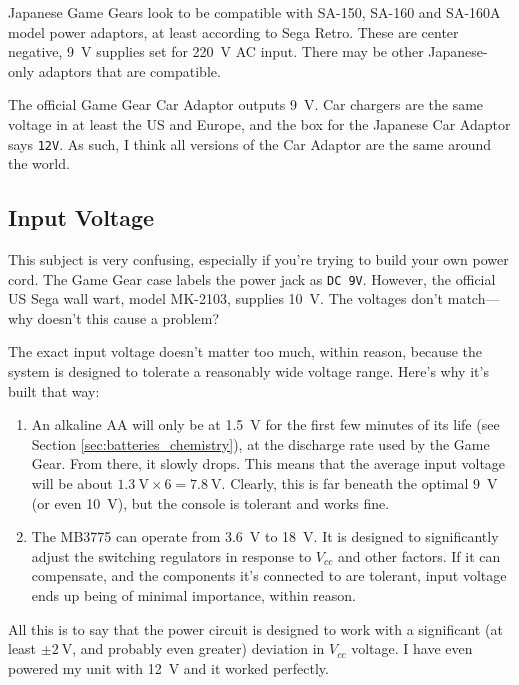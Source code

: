 \documentclass{article}
\newcommand{\Vcc}{$V_{cc}$}
\newcommand{\model}{\textsf}
\begin{document}
Japanese Game Gears look to be compatible with \model{SA-150},
\model{SA-160} and \model{SA-160A} model power adaptors, at least
according to Sega Retro. These are center negative, \qty{9}{\volt}
supplies set for \qty{220}{\volt} AC input. There may be other
Japanese-only adaptors that are compatible.

The official Game Gear Car Adaptor outputs \qty{9}{\volt}. Car
chargers are the same voltage in at least the US and Europe, and the
box for the Japanese Car Adaptor says \texttt{12V}. As such, I think
all versions of the Car Adaptor are the same around the world.

\subsection{Input Voltage}
\label{sec:input_voltage}
This subject is very confusing, especially if you're trying to build
your own power cord. The Game Gear case labels the power jack as
\texttt{DC 9V}. However, the official US Sega wall wart, model
\model{MK-2103}, supplies \qty{10}{\volt}. The voltages don't
match---why doesn't this cause a problem?

The exact input voltage doesn't matter too much, within reason,
because the system is designed to tolerate a reasonably wide voltage
range. Here's why it's built that way:

\begin{enumerate}
\item An alkaline AA will only be at \qty{1.5}{\volt} for the first
  few minutes of its life (see Section \ref{sec:batteries_chemistry}),
  at the discharge rate used by the Game Gear. From there, it slowly
  drops. This means that the average input voltage will be about
  $\qty{1.3}{\volt} \times{} 6 = \qty{7.8}{\volt}$. Clearly, this is
  far beneath the optimal \qty{9}{\volt} (or even \qty{10}{\volt}),
  but the console is tolerant and works fine.
\item The \model{MB3775} can operate from \qty{3.6}{\volt} to
  \qty{18}{\volt}. It is designed to significantly adjust the
  switching regulators in response to \Vcc{} and other factors. If it
  can compensate, and the components it's connected to are tolerant,
  input voltage ends up being of minimal importance, within reason.
\end{enumerate}

All this is to say that the power circuit is designed to work with a
significant (at least $\pm{}\qty{2}{\volt}$, and probably even
greater) deviation in \Vcc{} voltage. I have even powered my unit with
\qty{12}{\volt} and it worked perfectly.
\end{document}
